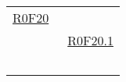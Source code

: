 \documentclass[../AnalisiDeiRequisiti.tex]{subfiles}
\begin{document}
\begin{longtable}{|c|c|}
	\hyperlink{R0F20}{R0F20}\\& \
	\hyperlink{R0F20.1}{R0F20.1}\\& \

\end{longtable}
\end{document}
